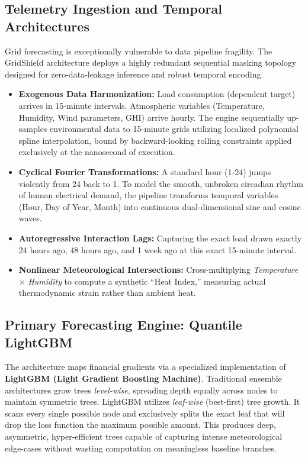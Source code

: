 \documentclass[11pt,a4paper]{article}
\begin{document}
\subsection{Telemetry Ingestion and Temporal Architectures}
Grid forecasting is exceptionally vulnerable to data pipeline fragility. The GridShield architecture deploys a highly redundant sequential masking topology designed for zero-data-leakage inference and robust temporal encoding.
\begin{itemize}
    \item \textbf{Exogenous Data Harmonization:} Load consumption (dependent target) arrives in 15-minute intervals. Atmospheric variables (Temperature, Humidity, Wind parameters, GHI) arrive hourly. The engine sequentially up-samples environmental data to 15-minute grids utilizing localized polynomial spline interpolation, bound by backward-looking rolling constraints applied exclusively at the nanosecond of execution.
    \item \textbf{Cyclical Fourier Transformations:} A standard hour (1-24) jumps violently from 24 back to 1. To model the smooth, unbroken circadian rhythm of human electrical demand, the pipeline transforms temporal variables (Hour, Day of Year, Month) into continuous dual-dimensional sine and cosine waves.
    \item \textbf{Autoregressive Interaction Lags:} Capturing the exact load drawn exactly 24 hours ago, 48 hours ago, and 1 week ago at this exact 15-minute interval.
    \item \textbf{Nonlinear Meteorological Intersections:} Cross-multiplying \textit{Temperature} $\times$ \textit{Humidity} to compute a synthetic ``Heat Index,'' measuring actual thermodynamic strain rather than ambient heat.
\end{itemize}

\subsection{Primary Forecasting Engine: Quantile LightGBM}
The architecture maps financial gradients via a specialized implementation of \textbf{LightGBM (Light Gradient Boosting Machine)}. Traditional ensemble architectures grow trees \textit{level-wise}, spreading depth equally across nodes to maintain symmetric trees. LightGBM utilizes \textit{leaf-wise} (best-first) tree growth. It scans every single possible node and exclusively splits the exact leaf that will drop the loss function the maximum possible amount. This produces deep, asymmetric, hyper-efficient trees capable of capturing intense meteorological edge-cases without wasting computation on meaningless baseline branches.
\end{document}
